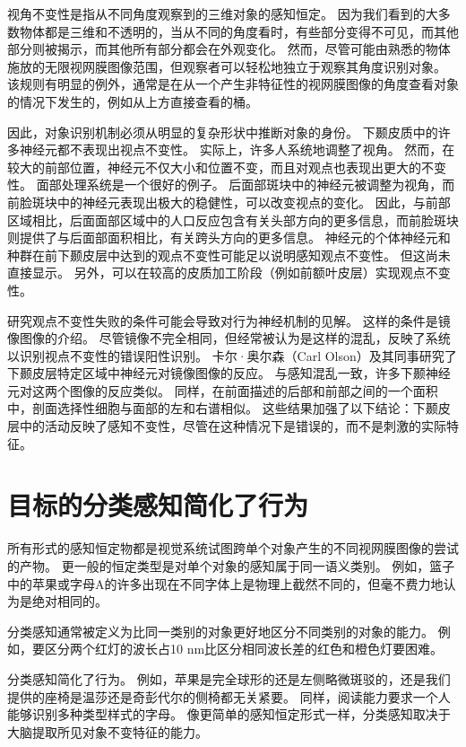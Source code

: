 视角不变性是指从不同角度观察到的三维对象的感知恒定。 因为我们看到的大多数物体都是三维和不透明的，当从不同的角度看时，有些部分变得不可见，而其他部分则被揭示，而其他所有部分都会在外观变化。 然而，尽管可能由熟悉的物体施放的无限视网膜图像范围，但观察者可以轻松地独立于观察其角度识别对象。 该规则有明显的例外，通常是在从一个产生非特征性的视网膜图像的角度查看对象的情况下发生的，例如从上方直接查看的桶。

因此，对象识别机制必须从明显的复杂形状中推断对象的身份。 下颞皮质中的许多神经元都不表现出视点不变性。 实际上，许多人系统地调整了视角。 然而，在较大的前部位置，神经元不仅大小和位置不变，而且对观点也表现出更大的不变性。 面部处理系统是一个很好的例子。 后面部斑块中的神经元被调整为视角，而前脸斑块中的神经元表现出极大的稳健性，可以改变视点的变化。 因此，与前部区域相比，后面面部区域中的人口反应包含有关头部方向的更多信息，而前脸斑块则提供了与后面部面积相比，有关跨头方向的更多信息。 神经元的个体神经元和种群在前下颞皮层中达到的观点不变性可能足以说明感知观点不变性。 但这尚未直接显示。 另外，可以在较高的皮质加工阶段（例如前额叶皮层）实现观点不变性。

研究观点不变性失败的条件可能会导致对行为神经机制的见解。 这样的条件是镜像图像的介绍。 尽管镜像不完全相同，但经常被认为是这样的混乱，反映了系统以识别视点不变性的错误阳性识别。 卡尔·奥尔森（Carl Olson）及其同事研究了下颞皮层特定区域中神经元对镜像图像的反应。 与感知混乱一致，许多下颞神经元对这两个图像的反应类似。 同样，在前面描述的后部和前部之间的一个面积中，剖面选择性细胞与面部的左和右谱相似。 这些结果加强了以下结论：下颞皮层中的活动反映了感知不变性，尽管在这种情况下是错误的，而不是刺激的实际特征。


\section{目标的分类感知简化了行为}

所有形式的感知恒定物都是视觉系统试图跨单个对象产生的不同视网膜图像的尝试的产物。 更一般的恒定类型是对单个对象的感知属于同一语义类别。 例如，篮子中的苹果或字母A的许多出现在不同字体上是物理上截然不同的，但毫不费力地认为是绝对相同的。

分类感知通常被定义为比同一类别的对象更好地区分不同类别的对象的能力。 例如，要区分两个红灯的波长占10 nm比区分相同波长差的红色和橙色灯要困难。

分类感知简化了行为。 例如，苹果是完全球形的还是左侧略微斑驳的，还是我们提供的座椅是温莎还是奇彭代尔的侧椅都无关紧要。 同样，阅读能力要求一个人能够识别多种类型样式的字母。 像更简单的感知恒定形式一样，分类感知取决于大脑提取所见对象不变特征的能力。

